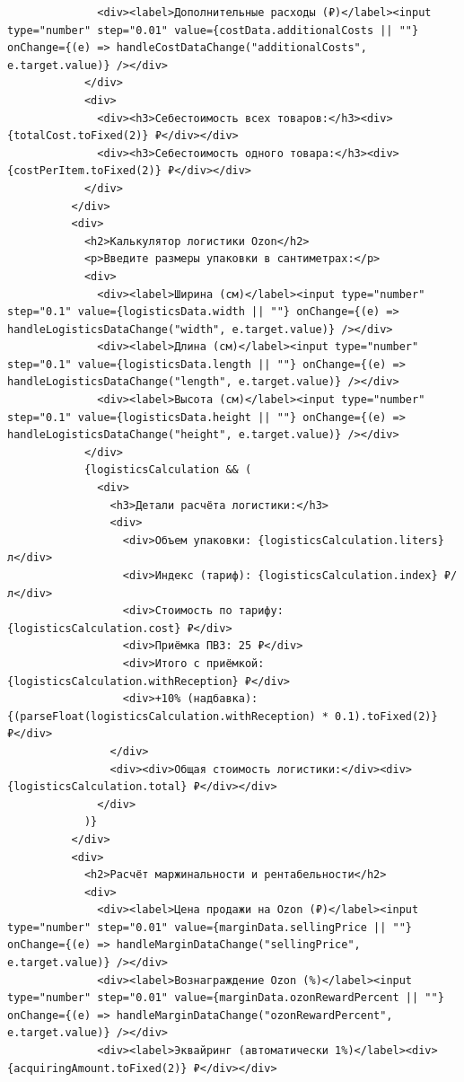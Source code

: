 \begin{code}
\begin{verbatim}
              <div><label>Дополнительные расходы (₽)</label><input type="number" step="0.01" value={costData.additionalCosts || ""} onChange={(e) => handleCostDataChange("additionalCosts", e.target.value)} /></div>
            </div>
            <div>
              <div><h3>Себестоимость всех товаров:</h3><div>{totalCost.toFixed(2)} ₽</div></div>
              <div><h3>Себестоимость одного товара:</h3><div>{costPerItem.toFixed(2)} ₽</div></div>
            </div>
          </div>
          <div>
            <h2>Калькулятор логистики Ozon</h2>
            <p>Введите размеры упаковки в сантиметрах:</p>
            <div>
              <div><label>Ширина (см)</label><input type="number" step="0.1" value={logisticsData.width || ""} onChange={(e) => handleLogisticsDataChange("width", e.target.value)} /></div>
              <div><label>Длина (см)</label><input type="number" step="0.1" value={logisticsData.length || ""} onChange={(e) => handleLogisticsDataChange("length", e.target.value)} /></div>
              <div><label>Высота (см)</label><input type="number" step="0.1" value={logisticsData.height || ""} onChange={(e) => handleLogisticsDataChange("height", e.target.value)} /></div>
            </div>
            {logisticsCalculation && (
              <div>
                <h3>Детали расчёта логистики:</h3>
                <div>
                  <div>Объем упаковки: {logisticsCalculation.liters} л</div>
                  <div>Индекс (тариф): {logisticsCalculation.index} ₽/л</div>
                  <div>Стоимость по тарифу: {logisticsCalculation.cost} ₽</div>
                  <div>Приёмка ПВЗ: 25 ₽</div>
                  <div>Итого с приёмкой: {logisticsCalculation.withReception} ₽</div>
                  <div>+10% (надбавка): {(parseFloat(logisticsCalculation.withReception) * 0.1).toFixed(2)} ₽</div>
                </div>
                <div><div>Общая стоимость логистики:</div><div>{logisticsCalculation.total} ₽</div></div>
              </div>
            )}
          </div>
          <div>
            <h2>Расчёт маржинальности и рентабельности</h2>
            <div>
              <div><label>Цена продажи на Ozon (₽)</label><input type="number" step="0.01" value={marginData.sellingPrice || ""} onChange={(e) => handleMarginDataChange("sellingPrice", e.target.value)} /></div>
              <div><label>Вознаграждение Ozon (%)</label><input type="number" step="0.01" value={marginData.ozonRewardPercent || ""} onChange={(e) => handleMarginDataChange("ozonRewardPercent", e.target.value)} /></div>
              <div><label>Эквайринг (автоматически 1%)</label><div>{acquiringAmount.toFixed(2)} ₽</div></div>

\end{verbatim}
\end{code}
